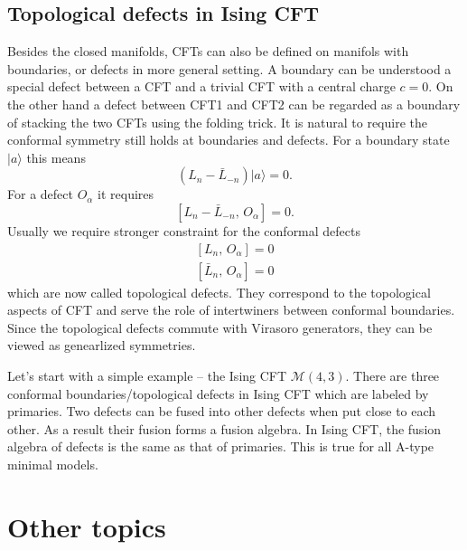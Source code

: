 \documentclass[submission, PhysLectNotes]{SciPost}
\begin{document}
\subsection{Topological defects in Ising CFT}
Besides the closed manifolds, CFTs can also be defined on manifols with boundaries, or defects in more general setting. A boundary can be understood a special defect between a CFT and a trivial CFT with a central charge $c=0$. On the other hand a defect between CFT1 and CFT2 can be regarded as a boundary of stacking the two CFTs using the folding trick. It is natural to require the conformal symmetry still holds at boundaries and defects. For a boundary state $\vert a \rangle$ this means 
\begin{equation}
	\left ( L_n - \bar{L}_{-n} \right ) \vert a \rangle = 0.
\end{equation}
For a defect $O_\alpha$ it requires
\begin{equation}
	\left[ L_n - \bar{L}_{-n},\, O_\alpha \right] = 0.
\end{equation}
Usually we require stronger constraint for the conformal defects 
\begin{equation}
	\begin{aligned}
		\left[ L_n,\, O_\alpha \right] = 0 \\
		\left[ \bar{L}_{n},\, O_\alpha \right] = 0
	\end{aligned}
\end{equation}
which are now called topological defects. They correspond to the topological aspects of CFT and serve the role of intertwiners between conformal boundaries. Since the topological defects commute with Virasoro generators, they can be viewed as genearlized symmetries. 

Let's start with a simple example -- the Ising CFT $\mathcal{M}(4,3)$. There are three conformal boundaries/topological defects in Ising CFT which are labeled by primaries. Two defects can be fused into other defects when put close to each other. As a result their fusion forms a fusion algebra. In Ising CFT, the fusion algebra of defects is the same as that of primaries. This is true for all A-type minimal models. 



\section{Other topics}
\end{document}

